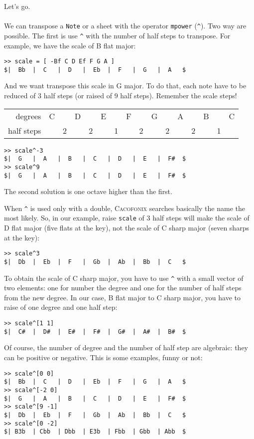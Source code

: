\documentclass{article}
\newcommand\cacofonix{\textsc{Cacofonix}\xspace}
\begin{document}
Let's go.

\paragraph{}

We can transpose a \lstinline!Note! or a sheet with the operator \lstinline!mpower! (\lstinline!^!). Two way are possible. The first is use \lstinline!^! with the number of half steps to transpose.
For example, we have the scale of B flat major:
\begin{lstlisting}
>> scale = [ -Bf C D Ef F G A ]
$|  Bb  |  C   |  D   |  Eb  |  F   |  G   |  A   $
\end{lstlisting}
And we want transpose this scale in G major. To do that, each note have to be reduced of $3$ half steps (or raised of $9$ half steps). Remember the scale steps!
\begin{center}
\begin{tabular}{rccccccccccccccc}
degrees    & C &   & D &   & E &   & F &   & G &   & A &   & B &   & C \\
half steps &   & 2 &   & 2 &   & 1 &   & 2 &   & 2 &   & 2 &   & 1 & \\
\end{tabular}
\end{center}
\begin{lstlisting}
>> scale^-3
$|  G   |  A   |  B   |  C   |  D   |  E   |  F#  $
>> scale^9
$|  G   |  A   |  B   |  C   |  D   |  E   |  F#  $
\end{lstlisting}
The second solution is one octave higher than the first.

When \lstinline!^! is used only with a double, \cacofonix searches basically the name the most likely. So, in our example, raise \lstinline!scale! of $3$ half steps will make the scale of D flat major (five flats at the key), not the scale of C sharp major (seven sharps at the key):
\begin{lstlisting}
>> scale^3
$|  Db  |  Eb  |  F   |  Gb  |  Ab  |  Bb  |  C   $
\end{lstlisting}
To obtain the scale of C sharp major, you have to use \lstinline!^! with a small vector of two elements: one for number the degree and one for the number of half steps from the new degree. In our case, B flat major to C sharp major, you have to raise of one degree and one half step:
\begin{lstlisting}
>> scale^[1 1]
$|  C#  |  D#  |  E#  |  F#  |  G#  |  A#  |  B#  $
\end{lstlisting}
Of course, the number of degree and the number of half step are algebraic: they can be positive or negative. This is some examples, funny or not:
\begin{lstlisting}
>> scale^[0 0]
$|  Bb  |  C   |  D   |  Eb  |  F   |  G   |  A   $
>> scale^[-2 0]
$|  G   |  A   |  B   |  C   |  D   |  E   |  F#  $
>> scale^[9 -1]
$|  Db  |  Eb  |  F   |  Gb  |  Ab  |  Bb  |  C   $
>> scale^[0 -2]
$| B3b  | Cbb  | Dbb  | E3b  | Fbb  | Gbb  | Abb  $
\end{lstlisting}
\end{document}
